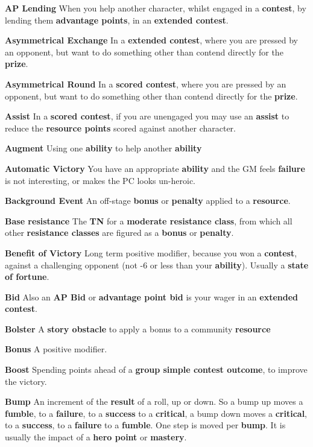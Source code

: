 \documentclass[
]{article}
\begin{document}
\textbf{AP Lending} When you help another character, whilst engaged in a
\textbf{contest}, by lending them \textbf{advantage points}, in an
\textbf{extended contest}.

\textbf{Asymmetrical Exchange} In a \textbf{extended contest}, where you
are pressed by an opponent, but want to do something other than contend
directly for the \textbf{prize}.

\textbf{Asymmetrical Round} In a \textbf{scored contest}, where you are
pressed by an opponent, but want to do something other than contend
directly for the \textbf{prize}.

\textbf{Assist} In a \textbf{scored contest}, if you are unengaged you
may use an \textbf{assist} to reduce the \textbf{resource points} scored
against another character.

\textbf{Augment} Using one \textbf{ability} to help another
\textbf{ability}

\textbf{Automatic Victory} You have an appropriate \textbf{ability} and
the GM feels \textbf{failure} is not interesting, or makes the PC looks
un-heroic.

\textbf{Background Event} An off-stage \textbf{bonus} or
\textbf{penalty} applied to a \textbf{resource}.

\textbf{Base resistance} The \textbf{TN} for a \textbf{moderate
resistance class}, from which all other \textbf{resistance classes} are
figured as a \textbf{bonus} or \textbf{penalty}.

\textbf{Benefit of Victory} Long term positive modifier, because you won
a \textbf{contest}, against a challenging opponent (not -6 or less than
your \textbf{ability}). Usually a \textbf{state of fortune}.

\textbf{Bid} Also an \textbf{AP Bid} or \textbf{advantage point bid} is
your wager in an \textbf{extended contest}.

\textbf{Bolster} A \textbf{story obstacle} to apply a bonus to a
community \textbf{resource}

\textbf{Bonus} A positive modifier.

\textbf{Boost} Spending points ahead of a \textbf{group simple contest
outcome}, to improve the victory.

\textbf{Bump} An increment of the \textbf{result} of a roll, up or down.
So a bump up moves a \textbf{fumble}, to a \textbf{failure}, to a
\textbf{success} to a \textbf{critical}, a bump down moves a
\textbf{critical}, to a \textbf{success}, to a \textbf{failure} to a
\textbf{fumble}. One step is moved per \textbf{bump}. It is usually the
impact of a \textbf{hero point} or \textbf{mastery}.
\end{document}
